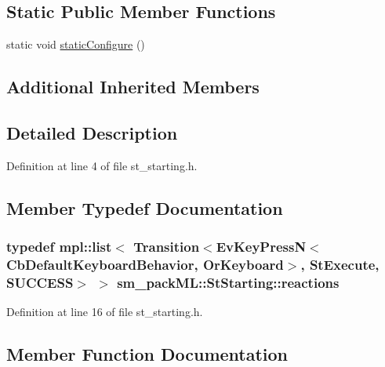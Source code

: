 \subsection*{Static Public Member Functions}
\begin{DoxyCompactItemize}
\item 
static void \hyperlink{structsm__packML_1_1StStarting_a027b510edb3a7fc5bc344ad9b7917f79}{static\+Configure} ()
\end{DoxyCompactItemize}
\subsection*{Additional Inherited Members}


\subsection{Detailed Description}


Definition at line 4 of file st\+\_\+starting.\+h.



\subsection{Member Typedef Documentation}
\subsubsection[{\texorpdfstring{reactions}{reactions}}]{\setlength{\rightskip}{0pt plus 5cm}typedef mpl\+::list$<$ Transition$<$Ev\+Key\+PressN$<$Cb\+Default\+Keyboard\+Behavior, {\bf Or\+Keyboard}$>$, {\bf St\+Execute}, {\bf S\+U\+C\+C\+E\+SS}$>$ $>$ {\bf sm\+\_\+pack\+M\+L\+::\+St\+Starting\+::reactions}}\hypertarget{structsm__packML_1_1StStarting_a904cf3eb697547a33964bcdabea0ae2e}{}\label{structsm__packML_1_1StStarting_a904cf3eb697547a33964bcdabea0ae2e}


Definition at line 16 of file st\+\_\+starting.\+h.



\subsection{Member Function Documentation}
